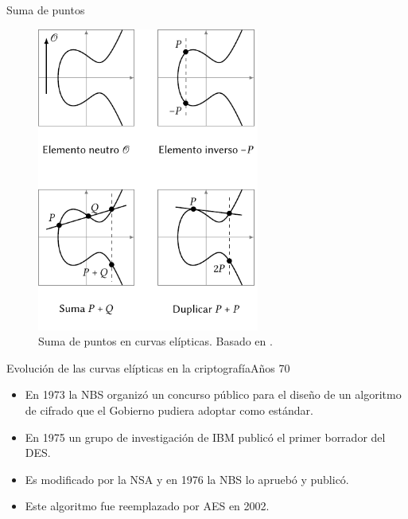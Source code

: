 \documentclass[spanish]{beamer}
\begin{document}
\begin{frame}{Suma de puntos}
  \begin{figure}[h]
    \centering
    \includegraphics[width=0.65\textwidth]{img/operaciones-curvas}
    \caption{Suma de puntos en curvas elípticas. Basado en  \parencite{eichlseder_elliptic_2016}.}
    \label{fig:operaciones-curvas}
  \end{figure}  
\end{frame}


\begin{frame}[fragile]{Evolución de las curvas elípticas en la criptografía}{Años 70}
  \begin{itemize}
  \item En 1973 la NBS organizó un concurso público para el diseño de un algoritmo de cifrado que el Gobierno pudiera adoptar como estándar.
  \item En 1975 un grupo de investigación de IBM publicó el primer borrador del DES.
  \item Es modificado por la NSA y en 1976 la NBS lo apruebó y publicó. %
  \item Este algoritmo fue reemplazado por AES en 2002.
  \end{itemize}
\end{frame}
\end{document}
